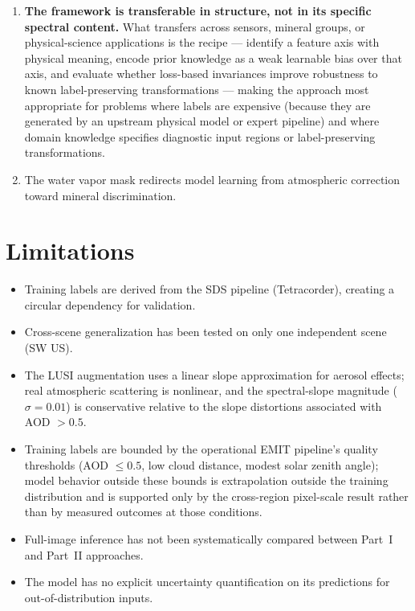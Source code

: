\documentclass[11pt]{report}
\begin{document}
\begin{enumerate}
  \item \textbf{The framework is transferable in structure, not in its specific spectral content.} What transfers across sensors, mineral groups, or physical-science applications is the recipe --- identify a feature axis with physical meaning, encode prior knowledge as a weak learnable bias over that axis, and evaluate whether loss-based invariances improve robustness to known label-preserving transformations --- making the approach most appropriate for problems where labels are expensive (because they are generated by an upstream physical model or expert pipeline) and where domain knowledge specifies diagnostic input regions or label-preserving transformations.
  \item The water vapor mask redirects model learning from atmospheric correction toward mineral discrimination.
\end{enumerate}

\section{Limitations}

\begin{itemize}
  \item Training labels are derived from the SDS pipeline (Tetracorder), creating a circular dependency for validation.
  \item Cross-scene generalization has been tested on only one independent scene (SW US).
  \item The LUSI augmentation uses a linear slope approximation for aerosol effects; real atmospheric scattering is nonlinear, and the spectral-slope magnitude ($\sigma = 0.01$) is conservative relative to the slope distortions associated with AOD $> 0.5$.
  \item Training labels are bounded by the operational EMIT pipeline's quality thresholds (AOD $\le 0.5$, low cloud distance, modest solar zenith angle); model behavior outside these bounds is extrapolation outside the training distribution and is supported only by the cross-region pixel-scale result rather than by measured outcomes at those conditions.
  \item Full-image inference has not been systematically compared between Part~I and Part~II approaches.
  \item The model has no explicit uncertainty quantification on its predictions for out-of-distribution inputs.
\end{itemize}
\end{document}
